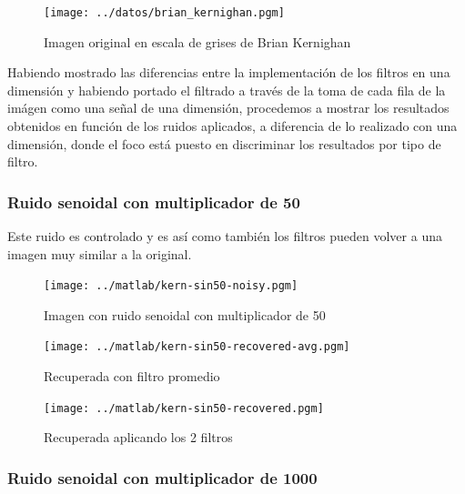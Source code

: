 \begin{figure}
\begin {center}
\texttt{[image: ../datos/brian\_kernighan.pgm]}
\end {center}
\caption{Imagen original en escala de grises de Brian Kernighan}
\label{fig:SinProm}
\end{figure}

Habiendo mostrado las diferencias entre la implementaci\'on de los filtros en
una dimensi\'on y habiendo portado el filtrado a trav\'es de la toma de cada
fila de la im\'agen como una se\~nal de una dimensi\'on, procedemos a mostrar
los resultados obtenidos en funci\'on de los ruidos aplicados, a diferencia de
lo realizado con una dimensi\'on, donde el foco est\'a puesto en discriminar los
resultados por tipo de filtro.

\subsubsection{Ruido senoidal con multiplicador de 50}

Este ruido es controlado y es as\'i como tambi\'en los filtros pueden volver a
una imagen muy similar a la original.

\begin{figure}
\begin {center}
\texttt{[image: ../matlab/kern-sin50-noisy.pgm]}
\end {center}
\caption{Imagen con ruido senoidal con multiplicador de 50}
\label{fig:SinProm}
\end{figure}

\begin{figure}
\begin {center}
\texttt{[image: ../matlab/kern-sin50-recovered-avg.pgm]}
\end {center}
\caption{Recuperada con filtro promedio}
\label{fig:SinProm}
\end{figure}

\begin{figure}
\begin {center}
\texttt{[image: ../matlab/kern-sin50-recovered.pgm]}
\end {center}
\caption{Recuperada aplicando los 2 filtros}
\label{fig:SinProm}
\end{figure}

\subsubsection{Ruido senoidal con multiplicador de 1000}


